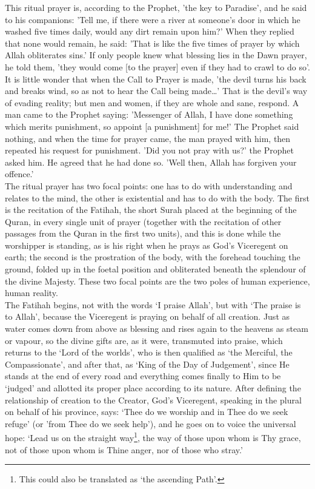 \documentclass[10pt, twoside,openright]{book}
\begin{document}
This ritual prayer is, according to the Prophet, 'the key to Paradise', and he said to his 
companions: 'Tell me, if there were a river at someone's door in which he washed five times daily, 
would any dirt remain upon him?' When they replied that none would remain, he said: 'That is like the 
five times of prayer by which Allah obliterates sins.' If only people knew what blessing lies in the 
Dawn prayer, he told them, 'they would come [to the prayer] even if they had to crawl to do so'. It 
is little wonder that when the Call to Prayer is made, 'the devil turns his back and breaks wind, so 
as not to hear the Call being made\ldots' That is the devil's way of evading reality; but men and 
women, if they are whole and sane, respond. A man came to the Prophet saying: 'Messenger of Allah, I 
have done something which merits punishment, so appoint [a punishment] for me!' The Prophet said 
nothing, and when the time for prayer came, the man prayed with him, then repeated his request for 
punishment. 'Did you not pray with us?' the Prophet asked him. He agreed that he had done so. 'Well 
then, Allah has forgiven your offence.' \\

The ritual prayer has two focal points: one has to do with understanding and relates to the mind, the 
other is existential and has to do with the body. The first is the recitation of the Fatihah, the 
short Surah placed at the beginning of the Quran, in every single unit of prayer (together with the 
recitation of other passages from the Quran in the first two units), and this is done while the 
worshipper is standing, as is his right when he prays as God's Viceregent on earth; the second is the 
prostration of the body, with the forehead touching the ground, folded up in the foetal position and 
obliterated beneath the splendour of the divine Majesty. These two focal points are the two poles of 
human experience, human reality. \\

The Fatihah begins, not with the words `I praise Allah', but with `The praise is to Allah', because 
the Viceregent is praying on behalf of all creation. Just as water comes down from above as blessing 
and rises again to the heavens as steam or vapour, so the divine gifts are, as it were, transmuted 
into praise, which returns to the `Lord of the worlds', who is then qualified as `the Merciful, the 
Compassionate', and after that, as `King of the Day of Judgement', since He stands at the end of 
every road and everything comes finally to Him to be `judged' and allotted its proper place according 
to its nature. After defining the relationship of creation to the Creator, God's Viceregent, speaking 
in the plural on behalf of his province, says: `Thee do we worship and in Thee do we seek refuge' (or 
'from Thee do we seek help'), and he goes on to voice the universal hope: `Lead us on the straight 
way\footnote{This could also be translated as `the ascending Path'.}, the way of those upon whom is Thy grace, not of those upon whom is Thine anger, nor of those 
who stray.' \\
\end{document}
